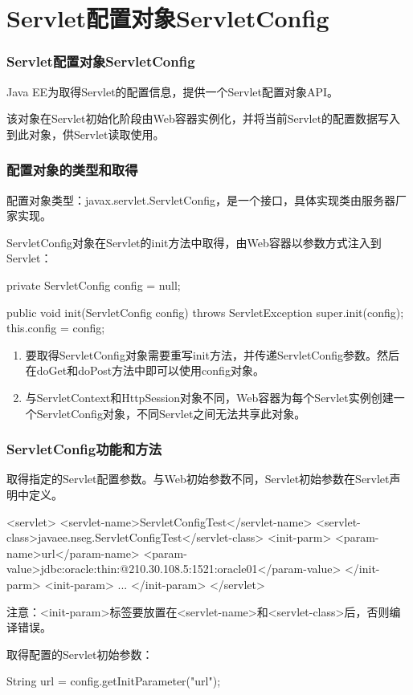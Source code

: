 \section{Servlet配置对象ServletConfig}

\begin{frame}[fragile] %
\frametitle{Servlet配置对象ServletConfig}

Java EE为取得Servlet的配置信息，提供一个Servlet配置对象API。

该对象在Servlet初始化阶段由Web容器实例化，并将当前Servlet的配置数据写入到此对象，供Servlet读取使用。

\end{frame}

\begin{frame}[fragile] %
\frametitle{配置对象的类型和取得} 

配置对象类型：javax.servlet.ServletConfig，是一个接口，具体实现类由服务器厂家实现。

ServletConfig对象在Servlet的init方法中取得，由Web容器以参数方式注入到Servlet：

\begin{javaCode}
private ServletConfig config = null;

public void init(ServletConfig config) throws ServletException {
  super.init(config);
  this.config = config;
}
\end{javaCode}

\begin{enumerate}\kai
\item 要取得ServletConfig对象需要重写init方法，并传递ServletConfig参数。然后
  在doGet和doPost方法中即可以使用config对象。
\item 与ServletContext和HttpSession对象不同，Web容器为每个Servlet实例创建一
  个ServletConfig对象，不同Servlet之间无法共享此对象。
\end{enumerate}
\end{frame}

\begin{frame}[fragile] %
\frametitle{ServletConfig功能和方法} 


取得指定的Servlet配置参数。与Web初始参数不同，Servlet初始参数在Servlet声明中定义。

\begin{xmlCode}
<servlet>  
  <servlet-name>ServletConfigTest</servlet-name>
  <servlet-class>javaee.nseg.ServletConfigTest</servlet-class>
  <init-parm>
    <param-name>url</param-name>
    <param-value>jdbc:oracle:thin:@210.30.108.5:1521:oracle01</param-value>
  </init-parm>
  <init-param>
    ...
  </init-param>
</servlet>  
\end{xmlCode}

注意：<init-param>标签要放置在<servlet-name>和<servlet-class>后，否则编译错误。

取得配置的Servlet初始参数：
\begin{javaCode}
String url = config.getInitParameter("url");
\end{javaCode}
\end{frame}

